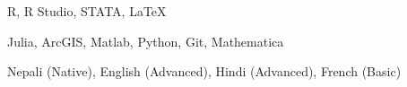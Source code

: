 
{ R, R Studio, STATA, \LaTeX}
{}

{ Julia, ArcGIS, Matlab, Python, Git, Mathematica}
{}

{  Nepali (Native), English (Advanced), Hindi (Advanced), French (Basic)}
{}
